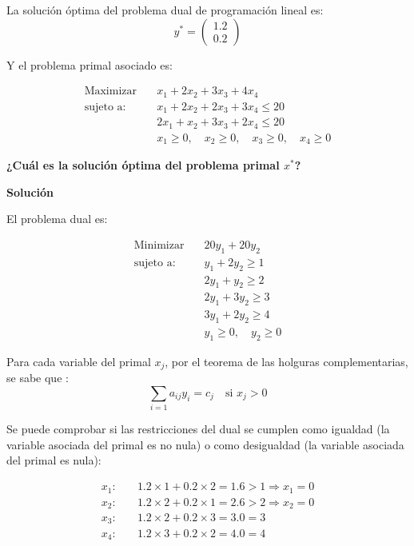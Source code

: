 
La solución óptima del problema dual de programación lineal es:
\[
y^* = \begin{pmatrix} 1.2 \\ 0.2 \end{pmatrix}
\]

Y el problema primal asociado es:

\[
\begin{aligned}
\text{Maximizar} \quad & x_1 + 2x_2 + 3x_3 + 4x_4 \\
\text{sujeto a:} \quad & x_1 + 2x_2 + 2x_3 + 3x_4 \leq 20 \\
& 2x_1 + x_2 + 3x_3 + 2x_4 \leq 20 \\
& x_1 \geq 0,\quad x_2 \geq 0,\quad x_3 \geq 0,\quad x_4 \geq 0
\end{aligned}
\]

\textbf{¿Cuál es la solución óptima del problema primal \( x^* \)?
}

\textbf{Solución}

El problema dual es:

\[
\begin{aligned}
\text{Minimizar} \quad & 20y_1 + 20y_2 \\
\text{sujeto a:} \quad
& y_1 + 2y_2 \geq 1 \\
& 2y_1 + y_2 \geq 2 \\
& 2y_1 + 3y_2 \geq 3 \\
& 3y_1 + 2y_2 \geq 4 \\
& y_1 \geq 0, \quad y_2 \geq 0
\end{aligned}
\]



Para cada variable del primal $x_j$, por el teorema de las holguras complementarias, se sabe que :
$$\sum_{i=1} a_{ij}y_i = c_j \quad \text{si } x_j > 0$$

Se puede comprobar si las restricciones del dual se cumplen como igualdad (la variable asociada del primal es no nula) o como desigualdad (la variable asociada del primal es nula):

\[
\begin{aligned}
x_1: &\quad 1.2 \times 1 + 0.2 \times 2 = 1.6 > 1 \Rightarrow x_1 = 0 \\
x_2: &\quad 1.2 \times 2 + 0.2 \times 1 = 2.6 > 2 \Rightarrow x_2 = 0 \\
x_3: &\quad 1.2 \times 2 + 0.2 \times 3 = 3.0 = 3 \\ %
x_4: &\quad 1.2 \times 3 + 0.2 \times 2 = 4.0 = 4 \\ %
\end{aligned}
\]

